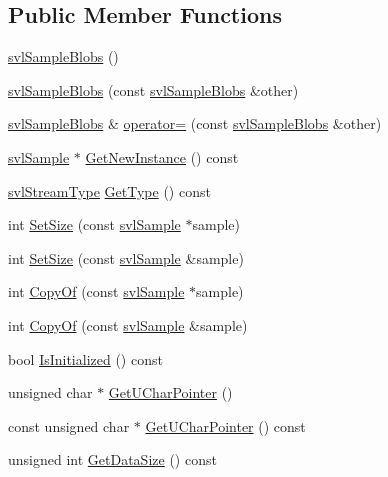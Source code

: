 \subsection*{Public Member Functions}
\begin{DoxyCompactItemize}
\item 
\hyperlink{classsvl_sample_blobs_adf04bcb647530a243efed9b7aef4ad64}{svl\+Sample\+Blobs} ()
\item 
\hyperlink{classsvl_sample_blobs_a25d3dd461d80d40fd4efd5a481254de5}{svl\+Sample\+Blobs} (const \hyperlink{classsvl_sample_blobs}{svl\+Sample\+Blobs} \&other)
\item 
\hyperlink{classsvl_sample_blobs}{svl\+Sample\+Blobs} \& \hyperlink{classsvl_sample_blobs_aec51edec6577d5c45971852d780587b4}{operator=} (const \hyperlink{classsvl_sample_blobs}{svl\+Sample\+Blobs} \&other)
\item 
\hyperlink{classsvl_sample}{svl\+Sample} $\ast$ \hyperlink{classsvl_sample_blobs_a1cc57aec0f029da6e111d5afa6a5c4f1}{Get\+New\+Instance} () const 
\item 
\hyperlink{svl_definitions_8h_aa00696d338a58db361335a01fd11e122}{svl\+Stream\+Type} \hyperlink{classsvl_sample_blobs_a3a9c555784a9e3884384279d09eb4e53}{Get\+Type} () const 
\item 
int \hyperlink{classsvl_sample_blobs_a5d94baff3a1f48fcefedaefe66f3e663}{Set\+Size} (const \hyperlink{classsvl_sample}{svl\+Sample} $\ast$sample)
\item 
int \hyperlink{classsvl_sample_blobs_a7c45a9ad1338a2bec69c33ea1f06c7b0}{Set\+Size} (const \hyperlink{classsvl_sample}{svl\+Sample} \&sample)
\item 
int \hyperlink{classsvl_sample_blobs_a05bbae50613c0054b53556a022bdc74f}{Copy\+Of} (const \hyperlink{classsvl_sample}{svl\+Sample} $\ast$sample)
\item 
int \hyperlink{classsvl_sample_blobs_a43090f1d88dae372ba1bc69c45afd450}{Copy\+Of} (const \hyperlink{classsvl_sample}{svl\+Sample} \&sample)
\item 
bool \hyperlink{classsvl_sample_blobs_a538e02055a16bb02a05ea958dd225e58}{Is\+Initialized} () const 
\item 
unsigned char $\ast$ \hyperlink{classsvl_sample_blobs_a36ea71ec0f2ade6b938f94eaee74719b}{Get\+U\+Char\+Pointer} ()
\item 
const unsigned char $\ast$ \hyperlink{classsvl_sample_blobs_ada954dc6f05f3122b4d59a2c89abc9ad}{Get\+U\+Char\+Pointer} () const 
\item 
unsigned int \hyperlink{classsvl_sample_blobs_ae15dd796c650f52fd262cc953f42e5e4}{Get\+Data\+Size} () const 

\end{DoxyCompactItemize}
